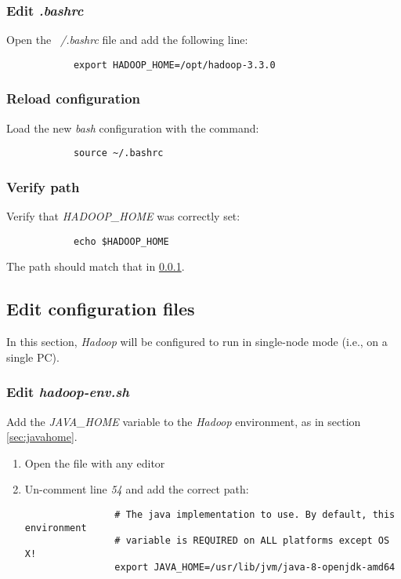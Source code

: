 \documentclass{article}
\begin{document}
        \subsubsection{Edit \emph{.bashrc}}
        \label{subsec:hadoophome}
        Open the \emph{~/.bashrc} file and add the following line:
        \begin{verbatim}
            export HADOOP_HOME=/opt/hadoop-3.3.0
        \end{verbatim}

        \subsubsection{Reload configuration}
        Load the new \emph{bash} configuration with the command:
        \begin{verbatim}
            source ~/.bashrc
        \end{verbatim}

        \subsubsection{Verify path}
        Verify that \emph{HADOOP\_HOME} was correctly set:
        \begin{verbatim}
            echo $HADOOP_HOME
        \end{verbatim}
        The path should match that in \ref{subsec:hadoophome}.

    \subsection{Edit configuration files}
    In this section, \emph{Hadoop} will be configured to run in single-node mode (i.e., on a single PC).

        \subsubsection{Edit \emph{hadoop-env.sh}}
        Add the \emph{JAVA\_HOME} variable to the \emph{Hadoop} environment, as in section \ref{sec:javahome}.

        \begin{enumerate}
            \item Open the file  with any editor
            
            \item Un-comment line \emph{54} and add the correct path:
            \begin{verbatim}
                # The java implementation to use. By default, this environment
                # variable is REQUIRED on ALL platforms except OS X!
                export JAVA_HOME=/usr/lib/jvm/java-8-openjdk-amd64
            \end{verbatim}
        \end{enumerate}
\end{document}
